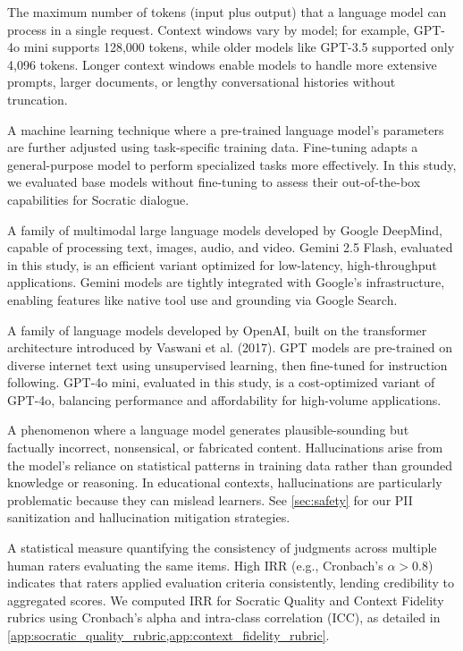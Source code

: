 \begin{description}[style=nextline,leftmargin=0em,itemsep=1em]
\item[\textbf{Context Window}] The maximum number of tokens (input plus output) that a language model can process in a single request. Context windows vary by model; for example, GPT-4o mini supports 128,000 tokens, while older models like GPT-3.5 supported only 4,096 tokens. Longer context windows enable models to handle more extensive prompts, larger documents, or lengthy conversational histories without truncation.

\item[\textbf{Fine-Tuning}] A machine learning technique where a pre-trained language model's parameters are further adjusted using task-specific training data. Fine-tuning adapts a general-purpose model to perform specialized tasks more effectively. In this study, we evaluated base models without fine-tuning to assess their out-of-the-box capabilities for Socratic dialogue.

\item[\textbf{Gemini}] A family of multimodal large language models developed by Google DeepMind, capable of processing text, images, audio, and video. Gemini 2.5 Flash, evaluated in this study, is an efficient variant optimized for low-latency, high-throughput applications. Gemini models are tightly integrated with Google's infrastructure, enabling features like native tool use and grounding via Google Search.

\item[\textbf{GPT (Generative Pre-trained Transformer)}] A family of language models developed by OpenAI, built on the transformer architecture introduced by Vaswani et al. (2017). GPT models are pre-trained on diverse internet text using unsupervised learning, then fine-tuned for instruction following. GPT-4o mini, evaluated in this study, is a cost-optimized variant of GPT-4o, balancing performance and affordability for high-volume applications.

\item[\textbf{Hallucination}] A phenomenon where a language model generates plausible-sounding but factually incorrect, nonsensical, or fabricated content. Hallucinations arise from the model's reliance on statistical patterns in training data rather than grounded knowledge or reasoning. In educational contexts, hallucinations are particularly problematic because they can mislead learners. See \cref{sec:safety} for our PII sanitization and hallucination mitigation strategies.

\item[\textbf{Inter-Rater Reliability (IRR)}] A statistical measure quantifying the consistency of judgments across multiple human raters evaluating the same items. High IRR (e.g., Cronbach's $\alpha > 0.8$) indicates that raters applied evaluation criteria consistently, lending credibility to aggregated scores. We computed IRR for Socratic Quality and Context Fidelity rubrics using Cronbach's alpha and intra-class correlation (ICC), as detailed in \cref{app:socratic_quality_rubric,app:context_fidelity_rubric}.


\end{description}

